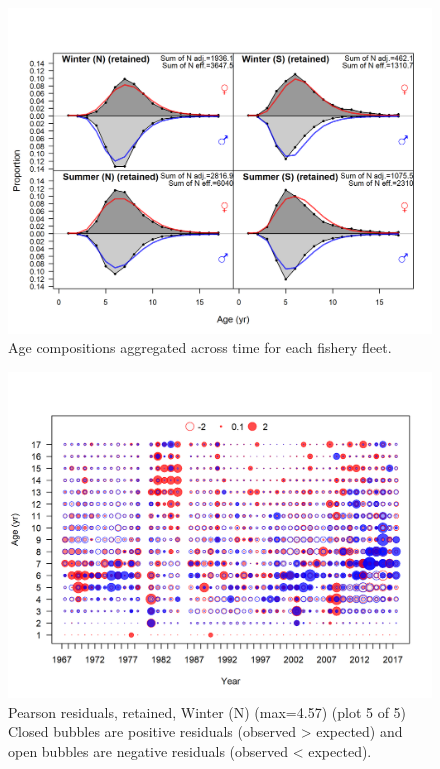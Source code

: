 \documentclass[12pt,]{article}
\begin{document}
\FloatBarrier

\begin{figure}
\centering
\includegraphics{r4ss/plots_mod1/comp_agefit__aggregated_across_time.png}
\caption{Age compositions aggregated across time for each fishery fleet.
\label{fig:age_agg}}
\end{figure}

\FloatBarrier

\begin{figure}
\centering
\includegraphics{r4ss/plots_mod1/comp_agefit_residsflt1mkt2_page5.png}
\caption{Pearson residuals, retained, Winter (N) (max=4.57) (plot 5 of
5)\\
Closed bubbles are positive residuals (observed \textgreater{} expected)
and open bubbles are negative residuals (observed \textless{} expected).
\label{fig:wn_age_pearson}}
\end{figure}
\end{document}
